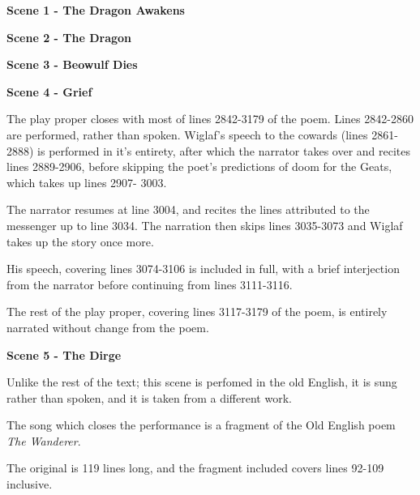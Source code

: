 \documentclass[a4paper]{article}
\begin{document}
{\centerline{\textbf{Scene 1 - The Dragon Awakens}}

\centerline{\textbf{Scene 2 - The Dragon}}

\centerline{\textbf{Scene 3 - Beowulf Dies}}

\centerline{\textbf{Scene 4 - Grief}}

The play proper closes with most of lines 2842-3179 of the poem.
Lines 2842-2860 are performed, rather than spoken.  
Wiglaf's speech to the cowards (lines 2861-2888) is performed in it's entirety, 
after which the narrator takes over and recites lines 2889-2906, before skipping 
the poet's predictions of doom for the Geats, which takes up lines 2907- 3003.

The narrator resumes at line 3004, and recites the lines attributed to the 
messenger up to line 3034. The narration then skips lines 3035-3073 and Wiglaf takes up 
the story once more.

His speech, covering lines 3074-3106 is included in full, with a brief interjection
from the narrator before continuing from lines 3111-3116.

The rest of the play proper, covering lines 3117-3179 of the poem, is entirely 
narrated without change from the poem.

\centerline{\textbf{Scene 5 - The Dirge}}

Unlike the rest of the text; this scene is perfomed in the old English, it is sung 
rather than spoken, and it is taken from a different work.

The song which closes the performance is a fragment of the Old English poem \textit{The Wanderer}.

The original is 119 lines long, and the fragment included covers lines 92-109 inclusive.

}
\end{document}
